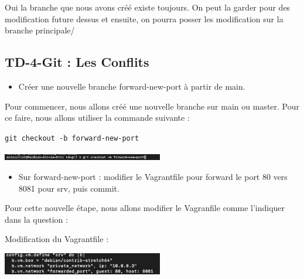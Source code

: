 \documentclass[12pt]{article}
\begin{document}
Oui la branche que nous avons créé existe toujours. On peut la garder pour des modification future dessus et ensuite, on pourra posser les modification sur la branche principale/

\newpage

\subsection{TD-4-Git : Les Conflits}

\vspace{0.3cm}

\begin{itemize}
  \item Créer une nouvelle branche forward-new-port à partir de main.
\end{itemize}

\vspace{0.3cm}

Pour commencer, nous allons créé une nouvelle branche sur main ou master. Pour ce faire, nous allons utiliser la commande suivante : 

\texttt{git checkout -b forward-new-port}

\vspace{0.3cm}

\begin{center}
  \includegraphics[width=7cm]{Image-TD-Git-4/git-checkout.png}
\end{center}

\vspace{0.3cm}

\begin{itemize}
  \item Sur forward-new-port : modifier le Vagrantfile pour forward le port 80 vers 8081 pour srv, puis commit.
\end{itemize}

\vspace{0.3cm}

Pour cette nouvelle étape, nous allons modifier le Vagranfile comme l'indiquer dans la question : 

\vspace{0.3cm}

Modification du Vagrantfile : 

\vspace{0.3cm}

\begin{center}
  \includegraphics[width=7cm]{Image-TD-Git-4/Forward-port.png}
\end{center}
\end{document}

